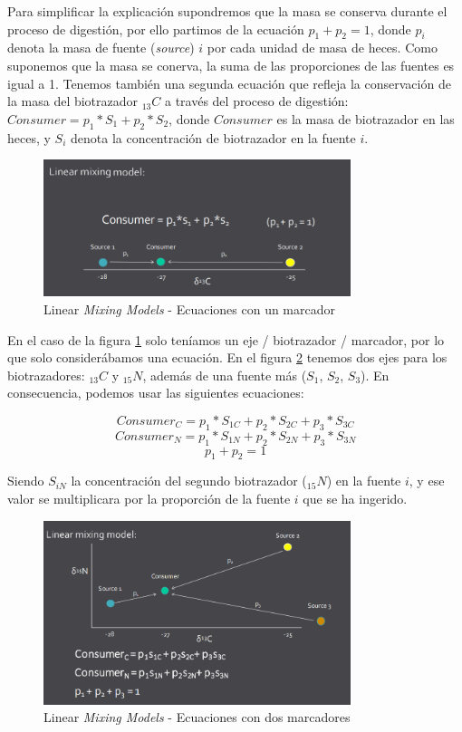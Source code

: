 Para simplificar la explicación supondremos que la masa se conserva durante el proceso de digestión, por ello partimos de la ecuación $p_1 + p_2 = 1$, donde $p_i$ denota la masa de fuente (\emph{source}) $i$ por cada unidad de masa de heces. Como suponemos que la masa se conerva, la suma de las proporciones de las fuentes es igual a 1. Tenemos también una segunda ecuación que refleja la conservación de la masa del biotrazador \textdelta$_{13}C$ a través del proceso de digestión: $Consumer = p_1*S_1 + p_2*S_2$, donde $Consumer$ es la masa de biotrazador en las heces, y $S_i$ denota la concentración de biotrazador en la fuente $i$.

\begin{figure}[h!] 
\centering
    \includegraphics[width=0.8\textwidth]{img/workMixing1.PNG}
\caption{Linear \emph{Mixing Models} - Ecuaciones con un marcador }
\label{fig:workMixing1}
\end{figure}

En el caso de la figura \ref{fig:workMixing1} solo teníamos un eje / biotrazador / marcador, por lo que solo considerábamos una ecuación. En el figura \ref{fig:workMixing2} tenemos dos ejes para los biotrazadores: \textdelta$_{13}C$ y \textdelta$_{15}N$, además de una fuente más ($S_1$, $S_2$, $S_3$). En consecuencia, podemos usar las siguientes ecuaciones: 

$$ Consumer_C = p_1*S_{1C} + p_2*S_{2C} + p_3*S_{3C} $$
$$ Consumer_N = p_1*S_{1N} + p_2*S_{2N} + p_3*S_{3N} $$
$$ p_1 + p_2 = 1 $$

Siendo $S_{iN}$ la concentración del segundo biotrazador  (\textdelta$_{15}N$) en la fuente $i$,  y ese valor se multiplicara por la proporción de la fuente $i$ que se ha ingerido.

\begin{figure}[h!] 
\centering
    \includegraphics[width=0.8\textwidth]{img/workMixing2.PNG}
\caption{Linear \emph{Mixing Models} - Ecuaciones con dos marcadores }
\label{fig:workMixing2}
\end{figure}

